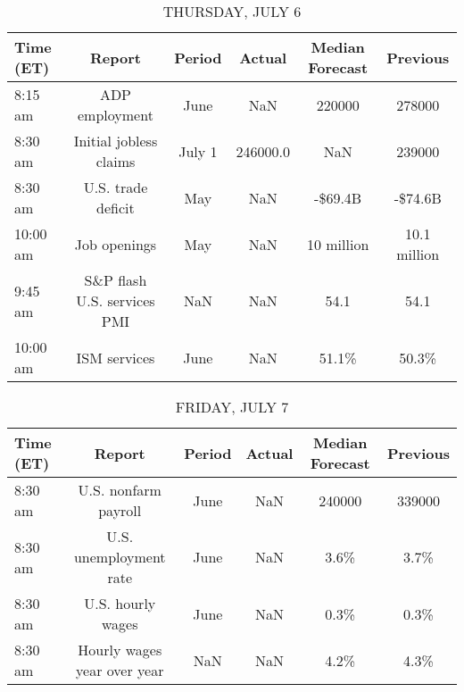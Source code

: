 \documentclass{article}%
\begin{document}
%


\begin{table}[htbp]%
\caption{THURSDAY, JULY 6}%
\centering%
\begin{adjustbox}{width=1\textwidth}%
\begin{tabular}{lccccc}
\toprule
Time (ET) &                      Report & Period &    Actual & Median Forecast &     Previous \\
\midrule
  8:15 am &              ADP employment &   June &       NaN &          220000 &       278000 \\
  8:30 am &      Initial jobless claims & July 1 &  246000.0 &             NaN &       239000 \\
  8:30 am &          U.S. trade deficit &    May &       NaN &         -\$69.4B &      -\$74.6B \\
 10:00 am &                Job openings &    May &       NaN &      10 million & 10.1 million \\
  9:45 am & S\&P flash U.S. services PMI &    NaN &       NaN &            54.1 &         54.1 \\
 10:00 am &                ISM services &   June &       NaN &           51.1\% &        50.3\% \\
\bottomrule
\end{tabular}
%
\end{adjustbox}%
\end{table}

%


\begin{table}[htbp]%
\caption{FRIDAY, JULY 7}%
\centering%
\begin{adjustbox}{width=1\textwidth}%
\begin{tabular}{lccccc}
\toprule
Time (ET) &                      Report & Period & Actual & Median Forecast & Previous \\
\midrule
  8:30 am &        U.S. nonfarm payroll &   June &    NaN &          240000 &   339000 \\
  8:30 am &      U.S. unemployment rate &   June &    NaN &            3.6\% &     3.7\% \\
  8:30 am &           U.S. hourly wages &   June &    NaN &            0.3\% &     0.3\% \\
  8:30 am & Hourly wages year over year &    NaN &    NaN &            4.2\% &     4.3\% \\
\bottomrule
\end{tabular}
%
\end{adjustbox}%
\end{table}
\end{document}
